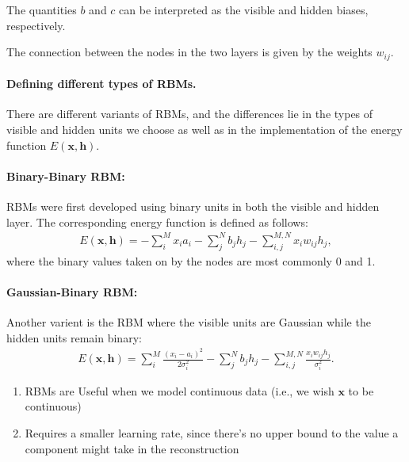 \documentclass[%
oneside,                 %
final,                   %
10pt]{article}
\begin{document}
The quantities $b$ and $c$ can be interpreted as the visible and hidden biases, respectively.

The connection between the nodes in the two layers is given by the weights $w_{ij}$. 

\paragraph{Defining different types of RBMs.}
There are different variants of RBMs, and the differences lie in the types of visible and hidden units we choose as well as in the implementation of the energy function $E(\mathbf{x},\mathbf{h})$. 


\paragraph{Binary-Binary RBM:}

RBMs were first developed using binary units in both the visible and hidden layer. The corresponding energy function is defined as follows:
\begin{align}
	E(\mathbf{x}, \mathbf{h}) = - \sum_i^M x_i a_i- \sum_j^N b_j h_j - \sum_{i,j}^{M,N} x_i w_{ij} h_j,
\end{align}
where the binary values taken on by the nodes are most commonly 0 and 1.



\paragraph{Gaussian-Binary RBM:}

Another varient is the RBM where the visible units are Gaussian while the hidden units remain binary:
\begin{align}
	E(\mathbf{x}, \mathbf{h}) = \sum_i^M \frac{(x_i - a_i)^2}{2\sigma_i^2} - \sum_j^N b_j h_j - \sum_{i,j}^{M,N} \frac{x_i w_{ij} h_j}{\sigma_i^2}. 
\end{align}




\begin{enumerate}
\item RBMs are Useful when we model continuous data (i.e., we wish $\mathbf{x}$ to be continuous)

\item Requires a smaller learning rate, since there's no upper bound to the value a component might take in the reconstruction
\end{enumerate}
\end{document}
